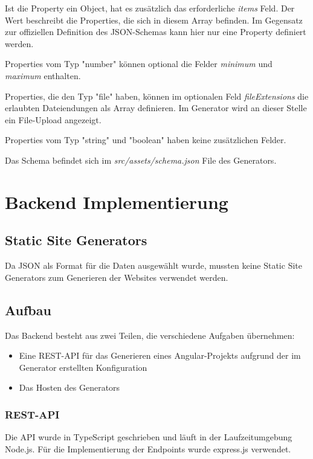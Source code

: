 Ist die Property ein Object, hat es zusätzlich das erforderliche \textit{items} Feld.
Der Wert beschreibt die Properties, die sich in diesem Array befinden.
Im Gegensatz zur offiziellen Definition des JSON-Schemas kann hier nur eine Property definiert werden.

Properties vom Typ "number" können optional die Felder \textit{minimum} und \textit{maximum} enthalten.

Properties, die den Typ "file" haben, können im optionalen Feld \textit{fileExtensions} die erlaubten
Dateiendungen als Array definieren.
Im Generator wird an dieser Stelle ein File-Upload angezeigt.

Properties vom Typ "string" und "boolean" haben keine zusätzlichen Felder.

Das Schema befindet sich im \textit{src/assets/schema.json} File des Generators.


\section{Backend Implementierung}

\subsection{Static Site Generators}
Da JSON als Format für die Daten ausgewählt wurde, mussten keine Static Site Generators zum Generieren der
Websites verwendet werden.


\subsection{Aufbau}
Das Backend besteht aus zwei Teilen, die verschiedene Aufgaben übernehmen:

\begin{itemize}
    \item Eine REST-API für das Generieren eines Angular-Projekts aufgrund der im Generator erstellten Konfiguration
    \item Das Hosten des Generators
\end{itemize}

\subsubsection{REST-API}
Die API wurde in TypeScript geschrieben und läuft in der Laufzeitumgebung Node.js.
Für die Implementierung der Endpoints wurde express.js verwendet.

